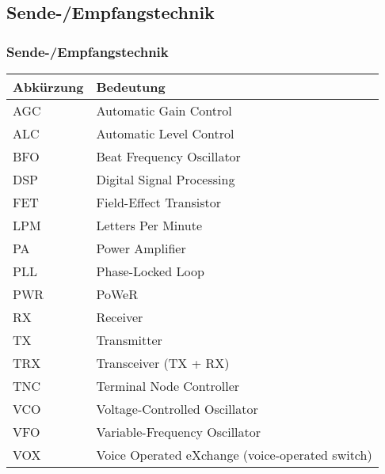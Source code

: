 \subsection*{Sende-/Empfangstechnik}
\begin{frame}
    \frametitle{Sende-/Empfangstechnik}

    \begin{center}
    \footnotesize
    \begin{tabular}{|l|l|}\hline
        \textbf{Abkürzung} & \textbf{Bedeutung}                         \\ \hline \hline
        AGC   & Automatic Gain Control                                  \\ \hline
        ALC   & Automatic Level Control                                 \\ \hline
        BFO   & Beat Frequency Oscillator                               \\ \hline
        DSP   & Digital Signal Processing                               \\ \hline
        FET   & Field-Effect Transistor                                 \\ \hline
        LPM   & Letters Per Minute                                      \\ \hline
        PA    & Power Amplifier                                         \\ \hline
        PLL   & Phase-Locked Loop                                       \\ \hline
        PWR   & PoWeR                                                   \\ \hline
        RX    & Receiver                                                \\ \hline
        TX    & Transmitter                                             \\ \hline
        TRX   & Transceiver (TX + RX)                                   \\ \hline
        TNC   & Terminal Node Controller                                \\ \hline
        VCO   & Voltage-Controlled Oscillator                           \\ \hline
        VFO   & Variable-Frequency Oscillator                           \\ \hline
        VOX   & Voice Operated eXchange (voice-operated switch)         \\ \hline
    \end{tabular}
    \end{center}

\end{frame}

